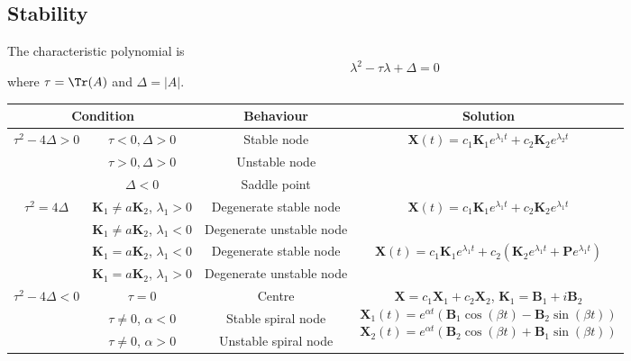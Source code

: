 \documentclass{article}
\begin{document}
\subsection{Stability}
The characteristic polynomial is
\[
    \lambda^2 - \tau \lambda + \Delta = 0
\]
where \(\tau = \Tr(A)\) and \(\Delta=|A|\).
\begin{table}[h]
    \small
    \centering\begin{tabular}{c c c c}\toprule
\multicolumn{2}{c}{Condition} & Behaviour & Solution \\\midrule
\(\tau^2 - 4\Delta > 0\) & \(\tau < 0, \Delta > 0\)
& Stable node & \multirow{3}{*}{\(\mathbf{X}(t)=c_1\mathbf{K}_1e^{\lambda_1 t}+c_2\mathbf{K}_2e^{\lambda_2 t}\)}\\
                                          & \(\tau > 0, \Delta > 0\)
& Unstable node & \\
                                          & \(\Delta < 0\)
& Saddle point & \\\midrule
\(\tau^2 = 4\Delta\)     & \(\mathbf{K}_1\ne a\mathbf{K}_2\), \(\lambda_1 > 0\)
& Degenerate stable node & \multirow{2}{*}{\(\mathbf{X}(t)=c_1\mathbf{K}_1e^{\lambda_1 t}+c_2\mathbf{K}_2e^{\lambda_1 t}\)}\\
                                          & \(\mathbf{K}_1 \ne a\mathbf{K}_2\), \(\lambda_1 < 0\)
& Degenerate unstable node & \\
                                          & \(\mathbf{K}_1=a\mathbf{K}_2\), \(\lambda_1 < 0\)
& Degenerate stable node & \multirow{2}{*}{\(\mathbf{X}(t)=c_1\mathbf{K}_1e^{\lambda_1 t}+c_2\left(\mathbf{K}_2e^{\lambda_1 t}+\mathbf{P}e^{\lambda_1 t}\right)\)}\\
                                          & \(\mathbf{K}_1=a\mathbf{K}_2\), \(\lambda_1 > 0\)
& Degenerate unstable node & \\\midrule
\(\tau^2 - 4\Delta < 0\) & \(\tau = 0\)
& Centre & \multirow{3}{*}{\parbox[c]{5.2cm}{\(\mathbf{X}=c_1\mathbf{X}_1+c_2\mathbf{X}_2\),
\(\mathbf{K}_1=\mathbf{B}_1+i\mathbf{B}_2\)\\
\(\mathbf{X}_1(t)=e^{\alpha t}\left( \mathbf{B}_1\cos(\beta t)-\mathbf{B}_2\sin(\beta t) \right)\)\\
\(\mathbf{X}_2(t)=e^{\alpha t}\left( \mathbf{B}_2\cos(\beta t)+\mathbf{B}_1\sin(\beta t) \right)\)}}\\
                                          & \(\tau \ne 0\), \(\alpha < 0\)
& Stable spiral node & \\
                                          & \(\tau \ne 0\), \(\alpha > 0\)
& Unstable spiral node & \\\bottomrule
    \end{tabular}
\end{table}
\end{document}
